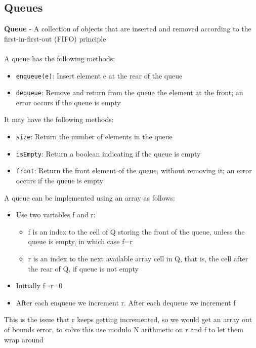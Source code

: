 \documentclass{article}[18pt]
\begin{document}
\subsection{Queues}
\textbf{Queue} - A collection of objects that are inserted and removed according to the first-in-first-out (FIFO) principle\\
\\
A queue has the following methods:
\begin{itemize}
	\item \texttt{enqueue(e)}: Insert element e at the rear of the queue
	\item \texttt{dequeue}: Remove and return from the queue the element at the front; an error occurs if the queue is empty
\end{itemize}
It may have the following methods:
\begin{itemize}
	\item \texttt{size}: Return the number of elements in the queue
	\item \texttt{isEmpty}: Return a boolean indicating if the queue is empty
	\item \texttt{front}: Return the front element of the queue, without removing it; an error occurs if the queue is empty
\end{itemize}
A queue can be implemented using an array as follows:
\begin{itemize}
	\item Use two variables f and r:
	\begin{itemize}
		\item f is an index to the cell of Q storing the front of the queue, unless the queue is empty, in which case f=r
		\item r is an index to the next available array cell in Q, that is, the cell after the rear of Q, if queue is not empty
	\end{itemize}
	\item Initially f=r=0
	\item After each enqueue we increment r. After each dequeue we increment f
\end{itemize}
This is the issue that r keeps getting incremented, so we would get an array out of bounds error, to solve this use modulo N arithmetic on r and f to let them wrap around
\end{document}
